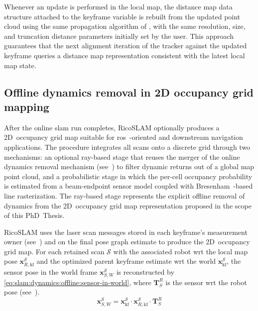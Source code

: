 Whenever an update is performed in the local map, the distance map data
structure attached to the keyframe variable is rebuilt from the updated point
cloud using the same propagation algorithm of
, with the same
resolution, size, and truncation distance parameters initially set by the user.
This approach guarantees that the next alignment iteration of the tracker
against the updated keyframe queries a distance map representation consistent
with the latest local map state.

\subsection{Offline dynamics removal in 2D occupancy grid mapping}
\label{sec:slam:dynamics:offline}

After the online \gls{slam} run completes, RicoSLAM optionally produces
a 2D~occupancy grid map suitable for \gls{ros}~\cite{ros}-oriented and
downstream navigation applications. The procedure integrates all scans onto
a discrete grid through two mechanisms: an optional ray-based stage that reuses
the merger of the online dynamics removal mechanism
(see~) to filter dynamic returns out of
a global map point cloud, and a probabilistic stage in which the per-cell
occupancy probability is estimated from a beam-endpoint sensor model coupled
with Bresenham~\cite{bresenham:ibm:1965,zingl:uas:2016}-based line
rasterization. The ray-based stage represents the explicit offline removal of
dynamics from the 2D~occupancy grid map representation
proposed in the scope of this PhD~Thesis.

RicoSLAM uses the laser scan messages stored in each keyframe's measurement
owner (see~) and on the final pose graph
estimate to produce the 2D~occupancy grid map. For each retained scan
$\mathcal{S}$ with the associated robot \gls{wrt} the local map pose
$\mathbf{x}_{R,\mathrm{kf}}^{\mathcal{S}}$ and the optimized parent keyframe
estimate \gls{wrt} the world $\mathbf{x}_{\mathrm{kf}}^{\mathcal{S}}$, the
sensor pose in the world frame $\mathbf{x}_{S,W}^{\mathcal{S}}$ is reconstructed
by \eqref{eq:slam:dynamics:offline:sensor-in-world}, where $\mathbf{T}_S^R$ is
the sensor \gls{wrt} the robot pose
(see~).
\begin{equation}
\label{eq:slam:dynamics:offline:sensor-in-world}
\mathbf{x}_{S,W}^{\mathcal{S}} =
\mathbf{x}_{\mathrm{kf}}^{\mathcal{S}}\cdot
\mathbf{x}_{R,\mathrm{kf}}^{\mathcal{S}}\cdot\mathbf{T}_S^R
\end{equation}

